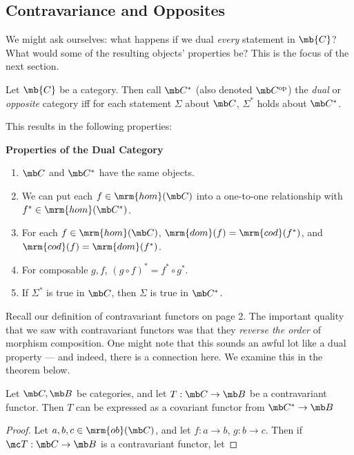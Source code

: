 \documentclass{fkbook}
\renewcommand{\dom}{\mrm{dom}}
\renewcommand{\cod}{\mrm{cod}}
\newcommand{\ob}{\mrm{ob}}
\newcommand{\homm}{\mrm{hom}}
\begin{document}
\begin{adjustwidth}{1em}{1em}
  \subsection{Contravariance and Opposites}
  We might ask ourselves: what happens if we dual \emph{every}
  statement in $\mb{C}$? What would some of the resulting objects'
  properties be? This is the focus of the next section.
  \begin{definition}
    Let $\mb{C}$ be a category. Then call $\mb C^*$ (also denoted
    $\mb C^{\rm op}$) the \emph{dual} or \emph{opposite} category iff
    for each statement $\Sigma$ about $\mb C$, $\Sigma^*$ holds about
    $\mb C^*$.
  \end{definition}
  This results in the following properties:
  \begin{leftbar}
    {\large \bfseries Properties of the Dual Category}
    \begin{enumerate}[label=\arabic*)]
      \item $\mb C$ and $\mb C^*$ have the same objects.
      \item We can put each $f \in \homm(\mb C)$ into a one-to-one
        relationship with $f^* \in \homm(\mb C^*)$.
      \item For each $f \in \homm(\mb C)$, $\dom(f) = \cod(f^*)$, and
        $\cod(f) = \dom(f^*)$.
      \item For composable $g,f$, $(g \circ f)^* = f^* \circ g^*$.
      \item If $\Sigma^*$ is true in $\mb C$, then $\Sigma$ is true in
        $\mb C^*$.
    \end{enumerate}
  \end{leftbar}
  Recall our definition of contravariant functors on page 2. The
  important quality that we saw with contravariant functors was that
  they \emph{reverse the order} of morphism composition. One might
  note that this sounds an awful lot like a dual property --- and
  indeed, there is a connection here. We examine this in the theorem
  below.
  \begin{theorem}
    Let $\mb C, \mb B$ be categories, and let $T : \mb C \to \mb B$ be
    a contravariant functor. Then $T$ can be expressed as a covariant
    functor from $\mb C^* \to \mb B$
  \end{theorem}
  \begin{proof}
    Let $a,b,c \in \ob(\mb C)$, and let $f : a \to b$, $g : b \to c$.
    Then if $\mc T : \mb C \to \mb B$ is a contravariant functor, let

\end{proof}
\end{adjustwidth}
\end{document}
